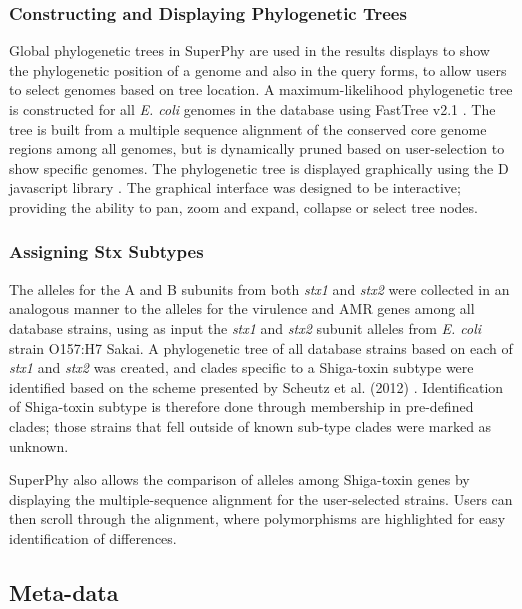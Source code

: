 \documentclass[a4paper,twoside]{article}
\begin{document}
\subsubsection{Constructing and Displaying Phylogenetic Trees}

Global phylogenetic trees in SuperPhy are used in the results displays to show the phylogenetic position of a genome and also in the query forms, to allow users to select genomes based on tree location. A maximum-likelihood phylogenetic tree is constructed for all \textit{E. coli} genomes in the database using FastTree v2.1 \cite{price_fasttree_2010}. The tree is built from a multiple sequence alignment of the conserved core genome regions among all genomes, but is dynamically pruned based on user-selection to show specific genomes. The phylogenetic tree is displayed graphically using the D javascript library \cite{bostock2011d3}. The graphical interface was designed to be interactive; providing the ability to pan, zoom and expand, collapse or select tree nodes.

\subsubsection{Assigning Stx Subtypes}

The alleles for the A and B subunits from both \textit{stx1} and \textit{stx2} were collected in an analogous manner to the alleles for the virulence and AMR genes among all database strains, using as input the \textit{stx1} and \textit{stx2} subunit alleles from \textit{E. coli} strain O157:H7 Sakai. A phylogenetic tree of all database strains based on each of \textit{stx1} and \textit{stx2} was created, and clades specific to a Shiga-toxin subtype were identified based on the scheme presented by Scheutz et al. (2012) \cite{scheutz_multicenter_2012}. Identification of Shiga-toxin subtype is therefore done through membership in pre-defined clades; those strains that fell outside of known sub-type clades were marked as unknown.

SuperPhy also allows the comparison of alleles among Shiga-toxin genes by displaying the multiple-sequence alignment for the user-selected strains. Users can then scroll through the alignment, where polymorphisms are highlighted for easy identification of differences.

\subsection{Meta-data}
\end{document}
